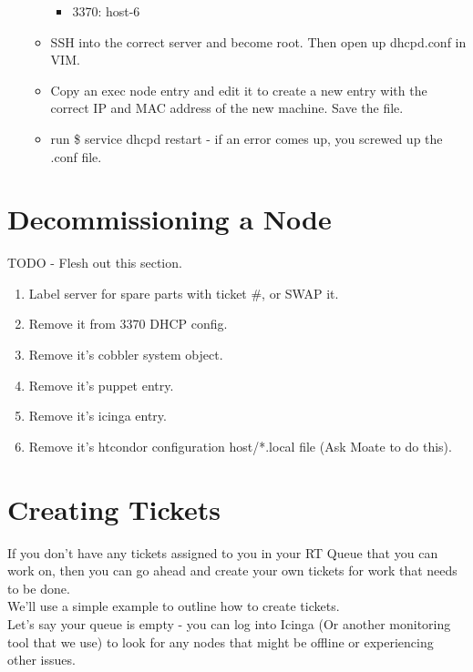 \documentclass[10pt,letterpaper]{article}
\begin{document}
\begin{enumerate}
\begin{itemize}
\begin{itemize}
                \item 3370: host-6
            \end{itemize}
            \item SSH into the correct server and become root. Then open up dhcpd.conf in VIM.
            \item Copy an exec node entry and edit it to create a new entry with the
            correct IP and MAC address of the new machine. Save the file.
            \item run {\selectfont \$ service dhcpd restart } - if
            an error comes up, you screwed up the .conf file.
        \end{itemize}
    \end{enumerate}
\clearpage

\section{Decommissioning a Node}
    TODO - Flesh out this section. \\

    \begin{enumerate}
        \item Label server for spare parts with ticket \#, or SWAP it.
        \item Remove it from 3370 DHCP config.
        \item Remove it's cobbler system object.
        \item Remove it's puppet entry.
        \item Remove it's icinga entry.
        \item Remove it's htcondor configuration host/*.local file (Ask Moate to do this).
    \end{enumerate}


\clearpage

\section{Creating Tickets}
    If you don't have any tickets assigned to you in your RT Queue that you can
    work on, then you can go ahead and create your own tickets for work that needs
    to be done.\\

    We'll use a simple example to outline how to create tickets.\\

    Let's say your queue is empty - you can log into Icinga (Or another monitoring
    tool that we use) to look for any nodes that might be offline or experiencing
    other issues.
\end{document}
